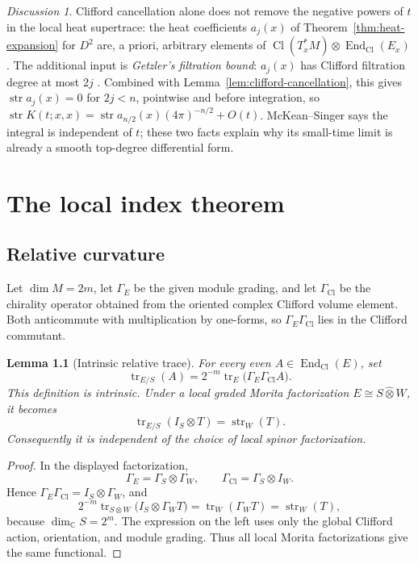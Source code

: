 \documentclass[11pt,oneside,reqno]{book}
\DeclareMathOperator{\Cl}{Cl}
\theoremstyle{plain}
\newtheorem{lemma}[theorem]{Lemma}
\theoremstyle{definition}
\theoremstyle{remark}
\newtheorem*{discussion}{Discussion}
\begin{document}
\begin{discussion}
Clifford cancellation alone does not remove the negative powers of \(t\)
in the local heat supertrace: the heat coefficients \(a_j(x)\) of
Theorem~\ref{thm:heat-expansion} for \(D^2\) are, a priori, arbitrary
elements of \(\Cl(T_x^*M)\otimes\operatorname{End}_{\Cl}(E_x)\).  The
additional input is \emph{Getzler's filtration bound}: \(a_j(x)\) has
Clifford filtration degree at most \(2j\) \cite[Chapter~4]{BGV}.  Combined
with Lemma~\ref{lem:clifford-cancellation}, this gives \(\operatorname{str}a_j(x)=0\) for \(2j<n\),
pointwise and before integration, so
\(\operatorname{str}K(t;x,x)=\operatorname{str}a_{n/2}(x)(4\pi)^{-n/2}
+O(t)\).  McKean--Singer says the integral is independent of \(t\); these
two facts explain why its small-time limit is already a smooth top-degree
differential form.
\end{discussion}


\chapter{The local index theorem}

\section{Relative curvature}

Let \(\dim M=2m\), let \(\Gamma_E\) be the given module grading, and let
\(\Gamma_{\Cl}\) be the chirality operator obtained from the oriented
complex Clifford volume element.  Both anticommute with multiplication by
one-forms, so \(\Gamma_E\Gamma_{\Cl}\) lies in the Clifford commutant.

\begin{lemma}[Intrinsic relative trace]\label{lem:relative-trace}
For every even \(A\in\operatorname{End}_{\Cl}(E)\), set
\[
 \operatorname{tr}_{E/S}(A)
 =2^{-m}\operatorname{tr}_E
   \bigl(\Gamma_E\Gamma_{\Cl}A\bigr).
\]
This definition is intrinsic.  Under a local graded Morita factorization
\(E\cong S\widehat\otimes W\), it becomes
\[
 \operatorname{tr}_{E/S}(I_S\otimes T)=\operatorname{str}_W(T).
\]
Consequently it is independent of the choice of local spinor factorization.
\end{lemma}

\begin{proof}
In the displayed factorization,
\[
 \Gamma_E=\Gamma_S\otimes\Gamma_W,
 \qquad
 \Gamma_{\Cl}=\Gamma_S\otimes I_W.
\]
Hence \(\Gamma_E\Gamma_{\Cl}=I_S\otimes\Gamma_W\), and
\[
 2^{-m}\operatorname{tr}_{S\otimes W}
 \bigl(I_S\otimes\Gamma_WT\bigr)
 =\operatorname{tr}_W(\Gamma_WT)
 =\operatorname{str}_W(T),
\]
because \(\dim_\mathbb C S=2^m\).  The expression on the left uses only the
global Clifford action, orientation, and module grading.  Thus all local
Morita factorizations give the same functional.
\end{proof}
\end{document}
